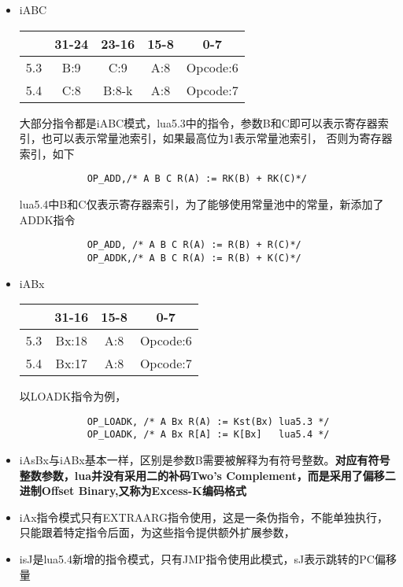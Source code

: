 \begin{itemize}
    \item {iABC
        \begin{center}
            \begin{tabular}{|c|c|c|c|c|} \hline
            \hbox{} & \hbox{31-24} & \hbox{23-16} & \hbox{15-8} & \hbox{0-7} \\ \hline
            \hbox{5.3} & \hbox{B:9} & \hbox{C:9} & \hbox{A:8}  & \hbox{Opcode:6} \\ \hline
            \hbox{5.4} & \hbox{C:8} & \hbox{B:8-k} & \hbox{A:8}  & \hbox{Opcode:7} \\ \hline
            \end{tabular}
        \end{center}
        大部分指令都是iABC模式，lua5.3中的指令，参数B和C即可以表示寄存器索引，也可以表示常量池索引，如果最高位为1表示常量池索引，
        否则为寄存器索引，如下        
        \begin{lstlisting}
            OP_ADD,/* A B C R(A) := RK(B) + RK(C)*/
        \end{lstlisting}
        lua5.4中B和C仅表示寄存器索引，为了能够使用常量池中的常量，新添加了ADDK指令
        \begin{lstlisting}
            OP_ADD, /* A B C R(A) := R(B) + R(C)*/
            OP_ADDK,/* A B C R(A) := R(B) + K(C)*/
        \end{lstlisting}        
    }
    \item {iABx
        \begin{center}
            \begin{tabular}{|c|c|c|c|} \hline
            \hbox{} & \hbox{31-16} & \hbox{15-8} & \hbox{0-7} \\ \hline
            \hbox{5.3} & \hbox{Bx:18} & \hbox{A:8}  & \hbox{Opcode:6} \\ \hline
            \hbox{5.4} & \hbox{Bx:17} & \hbox{A:8}  & \hbox{Opcode:7} \\ \hline
            \end{tabular}
        \end{center}
        以LOADK指令为例，
        \begin{lstlisting}
            OP_LOADK, /* A Bx R(A) := Kst(Bx) lua5.3 */
            OP_LOADK, /* A Bx R[A] := K[Bx]   lua5.4 */
        \end{lstlisting}                
    }
    \item {iAsBx与iABx基本一样，区别是参数B需要被解释为有符号整数。\textbf{对应有符号整数参数，lua并没有采用二的补码Two's Complement，而是采用了偏移二进制Offset Binary,又称为Excess-K编码格式}}
    \item {iAx指令模式只有EXTRAARG指令使用，这是一条伪指令，不能单独执行，只能跟着特定指令后面，为这些指令提供额外扩展参数，}
    \item {isJ是lua5.4新增的指令模式，只有JMP指令使用此模式，sJ表示跳转的PC偏移量}
\end{itemize}

